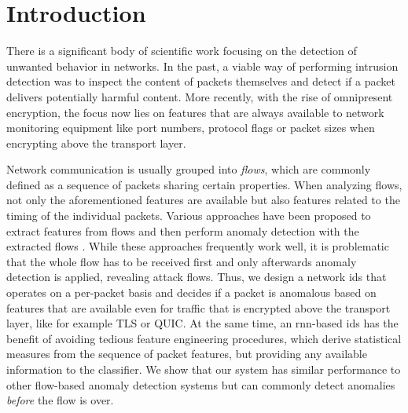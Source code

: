 \documentclass[conference]{IEEEtran}
\begin{document}
\maketitle

\section{Introduction}

There is a significant body of scientific work focusing on the detection of unwanted behavior in networks. In the past, a viable way of performing intrusion detection was to inspect the content of packets themselves and detect if a packet delivers potentially harmful content. More recently, with the rise of omnipresent encryption, %
the focus now lies on features that are always available to network monitoring equipment like port numbers, protocol flags or packet sizes when encrypting above the transport layer.

Network communication is usually grouped into \textit{flows}, which are commonly defined as a sequence of packets sharing certain properties. %
When analyzing flows, not only the aforementioned features are available but also features related to the timing of the individual packets. %
Various approaches have been proposed to extract features from flows and then perform anomaly detection with the extracted flows \cite{meghdouri_analysis_2018}.
While these approaches frequently work well, it is problematic that the whole flow has to be received first and only afterwards anomaly detection is applied, revealing attack flows. Thus, we design a network \gls{ids} that operates on a per-packet basis and decides if a packet is anomalous based on features that are available even for traffic that is encrypted above the transport layer, like for example TLS or QUIC.
At the same time, an \gls{rnn}-based \gls{ids} has the benefit of avoiding tedious feature engineering procedures, which derive statistical measures from the sequence of packet features, but providing any available information to the classifier.
We show that our system has similar performance to other flow-based anomaly detection systems but can commonly detect anomalies \textit{before} the flow is over.
\end{document}
